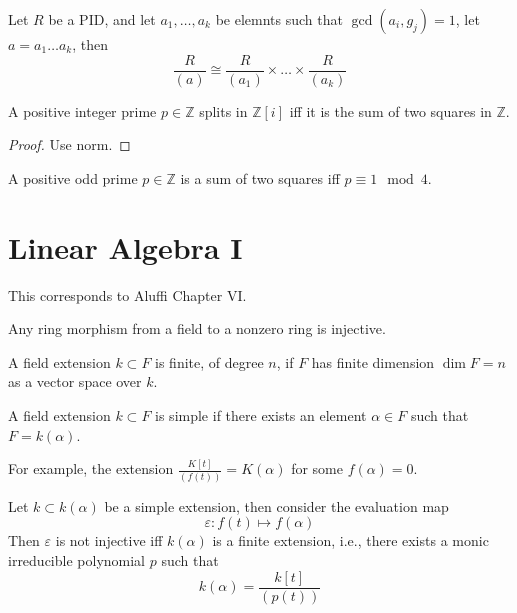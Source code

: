 \documentclass[openany]{book}
\newcommand{\Z}{\mathbb{Z}}
\begin{document}
\begin{cor}
    Let $R$ be a PID, and let $a_1,\dots, a_k$ be elemnts such that $\gcd(a_i,g_j)=1$, let $a=a_1\dots a_k$, then 
    \begin{equation*}
        \frac{R}{(a)}\cong\frac{R}{(a_1)}\times\dots\times\frac{R}{(a_k)}
    \end{equation*}
\end{cor}


\begin{prop}
    A positive integer prime $p\in\Z$ splits in $\Z[i]$ iff it is the sum of two squares in $\Z$.
\end{prop}
\begin{proof}
    Use norm.
\end{proof}


\begin{thm}[Fermat]
    A positive odd prime $p\in\Z$ is a sum of two squares iff $p\equiv 1\mod 4$.
\end{thm}












\chapter{Linear Algebra I}
This corresponds to Aluffi Chapter VI.



\begin{prop}
    Any ring morphism from a field to a nonzero ring is injective.
\end{prop}


\begin{defn}
    A field extension $k\subset F$ is finite, of degree $n$, if $F$ has finite dimension $\dim F=n$ as a vector space over $k$.
\end{defn}


\begin{defn}
    A field extension $k\subset F$ is simple if there exists an element $\alpha\in F$ such that $F=k(\alpha)$.

    For example, the extension $\frac{K[t]}{(f(t))}=K(\alpha)$ for some $f(\alpha)=0$. 
\end{defn}


\begin{prop}
    Let $k\subset k(\alpha)$ be a simple extension, then consider the evaluation map 
    \begin{equation*}
        \varepsilon: f(t)\mapsto f(\alpha)
    \end{equation*}
    Then $\varepsilon$ is not injective iff $k(\alpha)$ is a finite extension, i.e., there exists a monic irreducible polynomial $p$ such that 
    \begin{equation*}
        k(\alpha)=\frac{k[t]}{(p(t))}
    \end{equation*}
\end{prop}
\end{document}

